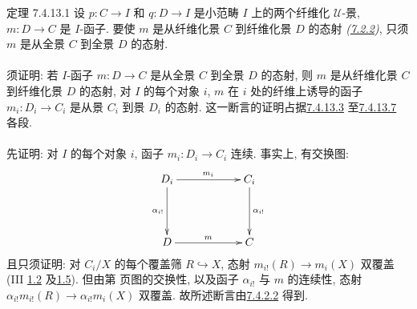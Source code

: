 \begin{enonce*}{定理 7.4.13.1}
设 $p:C\to I$ 和 $q:D\to I$ 是小范畴 $I$ 上的两个纤维化 $𝒰$-景,
$m:D\to C$ 是 $I$-函子.
要使 $m$ 是从纤维化景 $C$ 到纤维化景 $D$ 的态射
\emph{(\hyperref[VI.subsubsec7.2.2]{7.2.2})},
只须 $m$ 是从全景 $C$ 到全景 $D$ 的态射.
\end{enonce*}

\setcounter{subsubsection}{13}
\setcounter{paragraph}{1}
\paragraph{}

须证明: 若 $I$-函子 $m:D\to C$ 是从全景 $C$ 到全景 $D$ 的态射,
则 $m$ 是从纤维化景 $C$ 到纤维化景 $D$ 的态射,
\ie 对 $I$ 的每个对象 $i$,
$m$ 在 $i$ 处的纤维上诱导的函子 $m_i:D_i\to C_i$
是从景 $C_i$ 到景 $D_i$ 的态射.
这一断言的证明占据\hyperref[VI.par7.4.13.3]{7.4.13.3}
至\hyperref[VI.par7.4.13.7]{7.4.13.7} 各段.

\paragraph{}
先证明: 对 $I$ 的每个对象 $i$, 函子 $m_i:D_i\to C_i$ 连续.
事实上, 有交换图:
\[
\xymatrix@C=2cm@R=1.5cm{
D_i \ar[r]^{m_i} \ar[d]_{\alpha_{i!}}& C_i \ar[d]^{\alpha_{i!}}\\
D   \ar[r]^{m}& C
}
\]
且\pageoriginale 只须证明: 对 $C_i/X$ 的每个覆盖筛 $R\hookrightarrow X$,
态射 $m_{i!}(R)\to m_i(X)$ 双覆盖
(III \hyperref[III.prop1.2]{1.2} 及\hyperref[III.prop1.5]{1.5}).
但由第 页图的交换性,
以及函子 $\alpha_{i!}$ 与 $m$ 的连续性,
态射 $\alpha_{i!}m_{i!}(R)\to\alpha_{i!}m_i(X)$ 双覆盖.
故所述断言由\hyperref[VI.lem7.4.2.2]{7.4.2.2} 得到.

